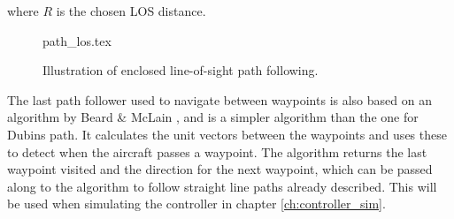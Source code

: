 where $R$ is the chosen LOS distance.

\begin{figure}
	{path_los.tex}
	\caption{Illustration of enclosed line-of-sight path following.}
	\label{fig:path_los}
\end{figure}

The last path follower used to navigate between waypoints is also based on an algorithm by Beard \& McLain \cite{suaBEARD}, and is a simpler algorithm than the one for Dubins path. It calculates the unit vectors between the waypoints and uses these to detect when the aircraft passes a waypoint. The algorithm returns the last waypoint visited and the direction for the next waypoint, which can be passed along to the algorithm to follow straight line paths already described. This will be used when simulating the controller in chapter \ref{ch:controller_sim}.